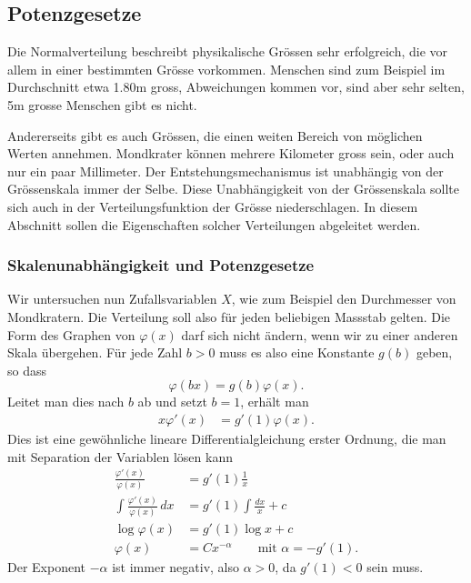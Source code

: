 %
%
%
\subsection{Potenzgesetze} \label{potenzgesetze}
%
Die Normalverteilung beschreibt physikalische Grössen sehr erfolgreich,
die vor allem in einer bestimmten Grösse vorkommen.
Menschen sind zum
Beispiel im Durchschnitt etwa 1.80m gross, Abweichungen kommen vor, sind
aber sehr selten, 5m grosse Menschen gibt es nicht.


Andererseits gibt es auch Grössen, die einen weiten Bereich von möglichen
Werten annehmen.
Mondkrater können mehrere Kilometer gross sein, oder auch
nur ein paar Millimeter.
Der Entstehungsmechanismus ist unabhängig von der
Grössenskala immer der Selbe.
Diese Unabhängigkeit von der Grössenskala
sollte sich auch in der Verteilungsfunktion der Grösse niederschlagen.
In diesem Abschnitt sollen die Eigenschaften solcher Verteilungen abgeleitet
werden.

\subsubsection{Skalenunabhängigkeit und Potenzgesetze}
Wir untersuchen nun Zufallsvariablen $X$, wie zum Beispiel den Durchmesser
von Mondkratern. 
Die Verteilung soll also für jeden beliebigen
Mass\-stab gelten.
Die Form des Graphen von $\varphi(x)$ darf sich nicht ändern,
wenn wir zu einer anderen Skala übergehen.
Für jede Zahl $b>0$ muss es also eine Konstante $g(b)$ geben, 
so dass
\[
\varphi(bx)=g(b)\varphi(x).
\]
Leitet man dies nach $b$ ab und setzt $b=1$, erhält man
\begin{align*}
x\varphi'(x)&=g'(1)\varphi(x).
\end{align*}
Dies ist eine gewöhnliche lineare Differentialgleichung
erster Ordnung, die man mit Separation der Variablen
lösen kann
\begin{align*}
\frac{\varphi'(x)}{\varphi(x)}&=g'(1)\frac1x
\\
\int\frac{\varphi'(x)}{\varphi(x)}\,dx&=g'(1)\int\frac{dx}x + c
\\
\log \varphi(x)&=g'(1)\log x+c
\\
\varphi(x)&=Cx^{-\alpha}\qquad\text{mit $\alpha=-g'(1)$}.
\end{align*}
Der Exponent $-\alpha$ ist immer negativ, also $\alpha > 0$,
da $g'(1)<0$ sein muss.

